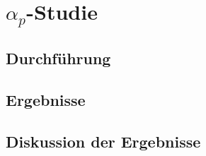 \chapter{$\alpha_p$-Studie}

\section{Durchführung}
\section{Ergebnisse}
\section{Diskussion der Ergebnisse}